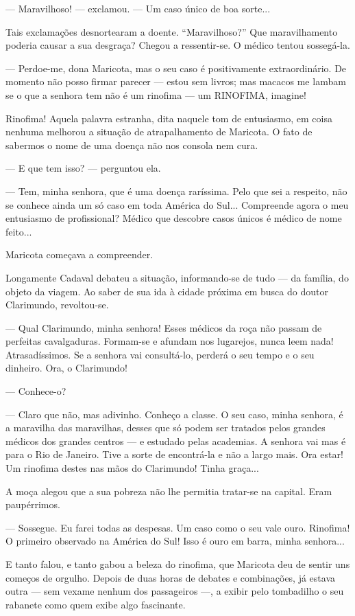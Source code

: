 --- Maravilhoso! --- exclamou. --- Um caso único de boa sorte...

Tais exclamações desnortearam a doente. ``Maravilhoso?'' Que
maravilhamento poderia causar a sua desgraça? Chegou a ressentir-se. O
médico tentou sossegá-la.

--- Perdoe-me, dona Maricota, mas o seu caso é positivamente
extraordinário. De momento não posso firmar parecer --- estou sem
livros; mas macacos me lambam se o que a senhora tem não é um rinofima
--- um RINOFIMA, imagine!

Rinofima! Aquela palavra estranha, dita naquele tom de entusiasmo, em
coisa nenhuma melhorou a situação de atrapalhamento de Maricota. O fato
de sabermos o nome de uma doença não nos consola nem cura.

--- E que tem isso? --- perguntou ela.

--- Tem, minha senhora, que é uma doença raríssima. Pelo que sei a
respeito, não se conhece ainda um só caso em toda América do Sul...
Compreende agora o meu entusiasmo de profissional? Médico que descobre
casos únicos é médico de nome feito...

Maricota começava a compreender.

Longamente Cadaval debateu a situação, informando-se de tudo --- da
família, do objeto da viagem. Ao saber de sua ida à cidade próxima em
busca do doutor Clarimundo, revoltou-se.

--- Qual Clarimundo, minha senhora! Esses médicos da roça não passam de
perfeitas cavalgaduras. Formam-se e afundam nos lugarejos, nunca leem
nada! Atrasadíssimos. Se a senhora vai consultá-lo, perderá o seu tempo
e o seu dinheiro. Ora, o Clarimundo!

--- Conhece-o?

--- Claro que não, mas adivinho. Conheço a classe. O seu caso, minha
senhora, é a maravilha das maravilhas, desses que só podem ser tratados
pelos grandes médicos dos grandes centros --- e estudado pelas
academias. A senhora vai mas é para o Rio de Janeiro. Tive a sorte de
encontrá-la e não a largo mais. Ora estar! Um rinofima destes nas mãos
do Clarimundo! Tinha graça...

A moça alegou que a sua pobreza não lhe permitia tratar-se na capital.
Eram paupérrimos.

--- Sossegue. Eu farei todas as despesas. Um caso como o seu vale ouro.
Rinofima! O primeiro observado na América do Sul! Isso é ouro em barra,
minha senhora...

E tanto falou, e tanto gabou a beleza do rinofima, que Maricota deu de
sentir uns começos de orgulho. Depois de duas horas de debates e
combinações, já estava outra --- sem vexame nenhum dos passageiros ---,
a exibir pelo tombadilho o seu rabanete como quem exibe algo fascinante.

